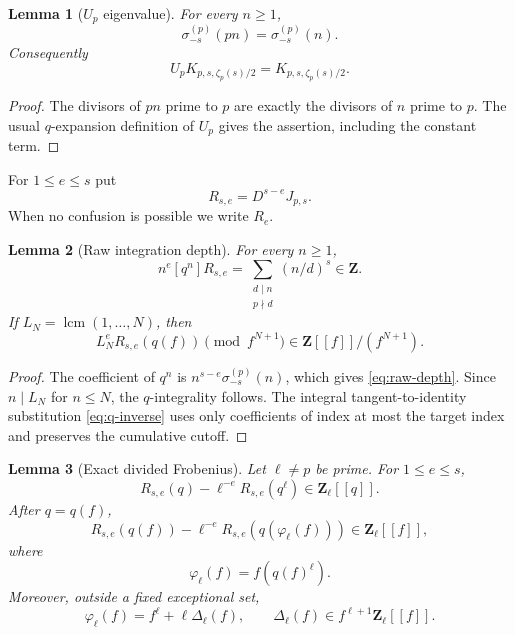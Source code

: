 \documentclass[11pt]{article}
\newtheorem{lemma}[lemma]{Lemma}
\theoremstyle{definition}
\theoremstyle{remark}
\newcommand{\Z}{\mathbf Z}
\newcommand{\lcmop}{\operatorname{lcm}}
\begin{document}
\begin{lemma}[$U_p$ eigenvalue]\label{lem:Up}
For every $n\ge1$,
\[
 \sigma_{-s}^{(p)}(pn)=\sigma_{-s}^{(p)}(n).
\]
Consequently
\[
 U_pK_{p,s,\zeta_p(s)/2}=K_{p,s,\zeta_p(s)/2}.
\]
\end{lemma}

\begin{proof}
The divisors of $pn$ prime to $p$ are exactly the divisors of $n$ prime to
$p$.  The usual $q$-expansion definition of $U_p$ gives the assertion,
including the constant term.
\end{proof}

For $1\le e\le s$ put
\begin{equation}\label{eq:R-def}
 R_{s,e}=D^{s-e}J_{p,s}.
\end{equation}
When no confusion is possible we write $R_e$.

\begin{lemma}[Raw integration depth]\label{lem:raw-depth}
For every $n\ge1$,
\begin{equation}\label{eq:raw-depth}
 n^e[q^n]R_{s,e}
 =\sum_{\substack{d\mid n\\p\nmid d}}(n/d)^s\in\Z.
\end{equation}
If $L_N=\lcmop(1,\ldots,N)$, then
\[
 L_N^eR_{s,e}(q(f))\pmod{f^{N+1}}
 \in\Z[[f]]/(f^{N+1}).
\]
\end{lemma}

\begin{proof}
The coefficient of $q^n$ is $n^{s-e}\sigma_{-s}^{(p)}(n)$, which gives
\eqref{eq:raw-depth}.  Since $n\mid L_N$ for $n\le N$, the $q$-integrality
follows.  The integral tangent-to-identity substitution \eqref{eq:q-inverse}
uses only coefficients of index at most the target index and preserves the
cumulative cutoff.
\end{proof}

\begin{lemma}[Exact divided Frobenius]\label{lem:Dwork}
Let $\ell\ne p$ be prime.  For $1\le e\le s$,
\begin{equation}\label{eq:Dwork-q}
 R_{s,e}(q)-\ell^{-e}R_{s,e}(q^\ell)\in\Z_\ell[[q]].
\end{equation}
After $q=q(f)$,
\begin{equation}\label{eq:Dwork-f}
 R_{s,e}(q(f))-\ell^{-e}R_{s,e}(q(\varphi_\ell(f)))
 \in\Z_\ell[[f]],
\end{equation}
where
\[
 \varphi_\ell(f)=f(q(f)^\ell).
\]
Moreover, outside a fixed exceptional set,
\begin{equation}\label{eq:Frob-expansion}
 \varphi_\ell(f)=f^\ell+\ell\Delta_\ell(f),
 \qquad
 \Delta_\ell(f)\in f^{\ell+1}\Z_\ell[[f]].
\end{equation}
\end{lemma}
\end{document}
